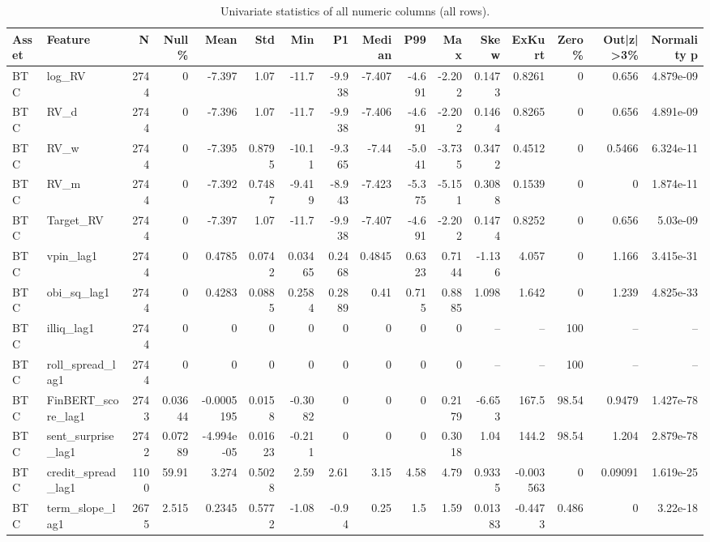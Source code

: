 \begin{table}[htbp]
\centering
\caption{Univariate statistics of all numeric columns (all rows).}
\label{tab:t2_numeric_stats}
\begin{tabular}{llrrrrrrrrrrrrrr}
\toprule
Asset & Feature & N & Null\% & Mean & Std & Min & P1 & Median & P99 & Max & Skew & ExKurt & Zero\% & Out|z|>3\% & Normality p \\
\midrule
BTC & log\_RV & 2744 & 0 & -7.397 & 1.07 & -11.7 & -9.938 & -7.407 & -4.691 & -2.202 & 0.1473 & 0.8261 & 0 & 0.656 & 4.879e-09 \\
BTC & RV\_d & 2744 & 0 & -7.396 & 1.07 & -11.7 & -9.938 & -7.406 & -4.691 & -2.202 & 0.1464 & 0.8265 & 0 & 0.656 & 4.891e-09 \\
BTC & RV\_w & 2744 & 0 & -7.395 & 0.8795 & -10.11 & -9.365 & -7.44 & -5.041 & -3.735 & 0.3472 & 0.4512 & 0 & 0.5466 & 6.324e-11 \\
BTC & RV\_m & 2744 & 0 & -7.392 & 0.7487 & -9.419 & -8.943 & -7.423 & -5.375 & -5.151 & 0.3088 & 0.1539 & 0 & 0 & 1.874e-11 \\
BTC & Target\_RV & 2744 & 0 & -7.397 & 1.07 & -11.7 & -9.938 & -7.407 & -4.691 & -2.202 & 0.1474 & 0.8252 & 0 & 0.656 & 5.03e-09 \\
BTC & vpin\_lag1 & 2744 & 0 & 0.4785 & 0.0742 & 0.03465 & 0.2468 & 0.4845 & 0.6323 & 0.7144 & -1.136 & 4.057 & 0 & 1.166 & 3.415e-31 \\
BTC & obi\_sq\_lag1 & 2744 & 0 & 0.4283 & 0.0885 & 0.2584 & 0.2889 & 0.41 & 0.715 & 0.8885 & 1.098 & 1.642 & 0 & 1.239 & 4.825e-33 \\
BTC & illiq\_lag1 & 2744 & 0 & 0 & 0 & 0 & 0 & 0 & 0 & 0 & -- & -- & 100 & -- & -- \\
BTC & roll\_spread\_lag1 & 2744 & 0 & 0 & 0 & 0 & 0 & 0 & 0 & 0 & -- & -- & 100 & -- & -- \\
BTC & FinBERT\_score\_lag1 & 2743 & 0.03644 & -0.0005195 & 0.0158 & -0.3082 & 0 & 0 & 0 & 0.2179 & -6.653 & 167.5 & 98.54 & 0.9479 & 1.427e-78 \\
BTC & sent\_surprise\_lag1 & 2742 & 0.07289 & -4.994e-05 & 0.01623 & -0.211 & 0 & 0 & 0 & 0.3018 & 1.04 & 144.2 & 98.54 & 1.204 & 2.879e-78 \\
BTC & credit\_spread\_lag1 & 1100 & 59.91 & 3.274 & 0.5028 & 2.59 & 2.61 & 3.15 & 4.58 & 4.79 & 0.9335 & -0.003563 & 0 & 0.09091 & 1.619e-25 \\
BTC & term\_slope\_lag1 & 2675 & 2.515 & 0.2345 & 0.5772 & -1.08 & -0.94 & 0.25 & 1.5 & 1.59 & 0.01383 & -0.4473 & 0.486 & 0 & 3.22e-18 \\

\end{tabular}
\end{table}

